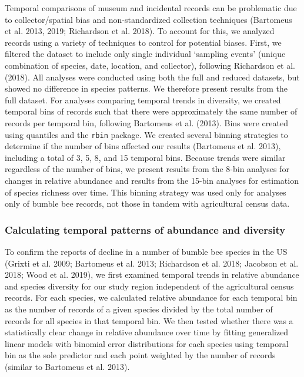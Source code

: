\documentclass[11pt,]{article}
\begin{document}
Temporal comparisons of museum and incidental records can be problematic
due to collector/spatial bias and non-standardized collection techniques
(Bartomeus et al. 2013, 2019; Richardson et al. 2018). To account for
this, we analyzed records using a variety of techniques to control for
potential biases. First, we filtered the dataset to include only single
individual `sampling events' (unique combination of species, date,
location, and collector), following Richardson et al. (2018). All
analyses were conducted using both the full and reduced datasets, but
showed no difference in species patterns. We therefore present results
from the full dataset. For analyses comparing temporal trends in
diversity, we created temporal bins of records such that there were
approximately the same number of records per temporal bin, following
Bartomeus et al. (2013). Bins were created using quantiles and the
\texttt{rbin} package. We created several binning strategies to
determine if the number of bins affected our results (Bartomeus et al.
2013), including a total of 3, 5, 8, and 15 temporal bins. Because
trends were similar regardless of the number of bins, we present results
from the 8-bin analyses for changes in relative abundance and results
from the 15-bin analyses for estimation of species richness over time.
This binning strategy was used only for analyses only of bumble bee
records, not those in tandem with agricultural census data.

\hypertarget{calculating-temporal-patterns-of-abundance-and-diversity}{%
\subsubsection{Calculating temporal patterns of abundance and
diversity}\label{calculating-temporal-patterns-of-abundance-and-diversity}}

To confirm the reports of decline in a number of bumble bee species in
the US (Grixti et al. 2009; Bartomeus et al. 2013; Richardson et al.
2018; Jacobson et al. 2018; Wood et al. 2019), we first examined
temporal trends in relative abundance and species diversity for our
study region independent of the agricultural census records. For each
species, we calculated relative abundance for each temporal bin as the
number of records of a given species divided by the total number of
records for all species in that temporal bin. We then tested whether
there was a statistically clear change in relative abundance over time
by fitting generalized linear models with binomial error distributions
for each species using temporal bin as the sole predictor and each point
weighted by the number of records (similar to Bartomeus et al. 2013).
\end{document}
